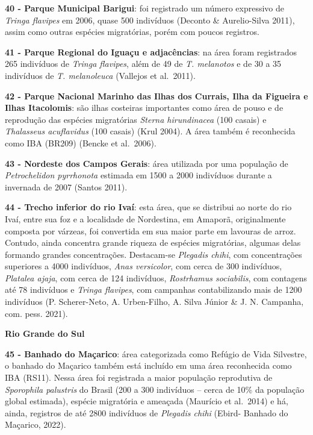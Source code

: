 \documentclass[
  oneside]{scrbook}
\begin{document}
\textbf{40 - Parque Municipal Barigui}: foi registrado um número expressivo de \emph{Tringa flavipes} em 2006, quase 500 indivíduos (Deconto \& Aurelio-Silva 2011), assim como outras espécies migratórias, porém com poucos registros.

\textbf{41 - Parque Regional do Iguaçu e adjacências}: na área foram registrados 265 indivíduos de \emph{Tringa flavipes}, além de 49 de \emph{T. melanotos} e de 30 a 35 indivíduos de \emph{T. melanoleuca} (Vallejos et al.~2011).

\textbf{42 - Parque Nacional Marinho das Ilhas dos Currais, Ilha da Figueira e Ilhas Itacolomis}: são ilhas costeiras importantes como área de pouso e de reprodução das espécies migratórias \emph{Sterna hirundinacea} (100 casais) e \emph{Thalasseus acuflavidus} (100 casais) (Krul 2004). A área também é reconhecida como IBA (BR209) (Bencke et al.~2006).

\textbf{43 - Nordeste dos Campos Gerais}: área utilizada por uma população de \emph{Petrochelidon pyrrhonota} estimada em 1500 a 2000 indivíduos durante a invernada de 2007 (Santos 2011).

\textbf{44 - Trecho inferior do rio Ivaí}: esta área, que se distribui ao norte do rio Ivaí, entre sua foz e a localidade de Nordestina, em Amaporã, originalmente composta por várzeas, foi convertida em sua maior parte em lavouras de arroz. Contudo, ainda concentra grande riqueza de espécies migratórias, algumas delas formando grandes concentrações. Destacam-se \emph{Plegadis chihi}, com concentrações superiores a 4000 indivíduos, \emph{Anas versicolor}, com cerca de 300 indivíduos, \emph{Platalea ajaja}, com cerca de 124 indivíduos, \emph{Rostrhamus sociabilis}, com contagens até 78 indivíduos e \emph{Tringa flavipes}, com campanhas contabilizando mais de 1200 indivíduos (P. Scherer-Neto, A. Urben-Filho, A. Silva Júnior \& J. N. Campanha, com. pess. 2021).

\textbf{Rio Grande do Sul}

\textbf{45 - Banhado do Maçarico}: área categorizada como Refúgio de Vida Silvestre, o banhado do Maçarico também está incluído em uma área reconhecida como IBA (RS11). Nessa área foi registrada a maior população reprodutiva de \emph{Sporophila palustris} do Brasil (200 a 300 indivíduos -- cerca de 10\% da população global estimada), espécie migratória e ameaçada (Maurício et al.~2014) e há, ainda, registros de até 2800 indivíduos de \emph{Plegadis chihi} (Ebird- Banhado do Maçarico, 2022).
\end{document}
